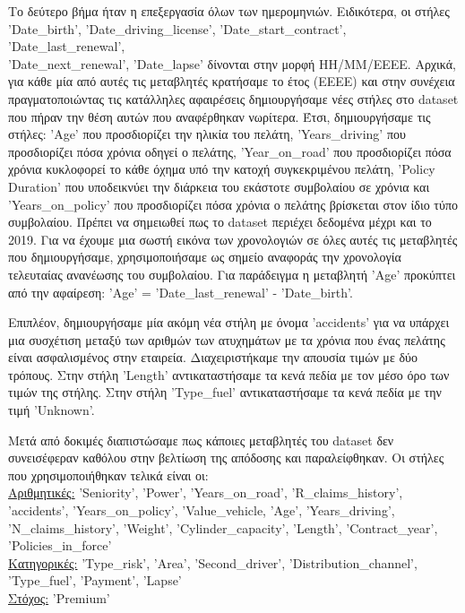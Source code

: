\documentclass{llncs}
\begin{document}
Το δεύτερο βήμα ήταν η επεξεργασία όλων των ημερομηνιών. Ειδικότερα, οι στήλες 'Date\_birth', 'Date\_driving\_license', 'Date\_start\_contract', 'Date\_last\_renewal', \\
'Date\_next\_renewal', 'Date\_lapse' δίνονται στην μορφή ΗΗ/ΜΜ/ΕΕΕΕ. Αρχικά, για κάθε μία από αυτές τις μεταβλητές κρατήσαμε το έτος (ΕΕΕΕ) και στην συνέχεια πραγματοποιώντας τις κατάλληλες αφαιρέσεις
δημιουργήσαμε νέες στήλες στο dataset που πήραν την θέση αυτών που αναφέρθηκαν νωρίτερα. Έτσι, δημιουργήσαμε τις στήλες: 'Age' που προσδιορίζει την ηλικία του πελάτη, 'Years\_driving' που προσδιορίζει 
πόσα χρόνια οδηγεί ο πελάτης, 'Year\_on\_road' που προσδιορίζει πόσα χρόνια κυκλοφορεί το κάθε όχημα υπό την κατοχή συγκεκριμένου πελάτη, 'Policy Duration' που υποδεικνύει την διάρκεια του εκάστοτε συμβολαίου σε χρόνια και 
'Years\_on\_policy' που προσδιορίζει πόσα χρόνια ο πελάτης βρίσκεται στον ίδιο τύπο συμβολαίου. Πρέπει να σημειωθεί πως το dataset περιέχει δεδομένα μέχρι και το 2019. Για να έχουμε μια σωστή εικόνα των χρονολογιών
σε όλες αυτές τις μεταβλητές που δημιουργήσαμε, χρησιμοποιήσαμε ως σημείο αναφοράς την χρονολογία τελευταίας ανανέωσης του συμβολαίου. Για παράδειγμα η μεταβλητή 'Age' προκύπτει από την αφαίρεση:
'Age' = 'Date\_last\_renewal' - 'Date\_birth'.

Επιπλέον, δημιουργήσαμε μία ακόμη νέα στήλη με όνομα 'accidents' για να υπάρχει μια συσχέτιση μεταξύ των αριθμών των ατυχημάτων με τα χρόνια που ένας πελάτης είναι ασφαλισμένος στην εταιρεία.
Διαχειριστήκαμε την απουσία τιμών με δύο τρόπους. Στην στήλη 'Length' αντικαταστήσαμε τα κενά πεδία με τον μέσο όρο των τιμών της στήλης. Στην στήλη 'Type\_fuel' αντικαταστήσαμε τα κενά πεδία με την τιμή 
'Unknown'.

Μετά από δοκιμές διαπιστώσαμε πως κάποιες μεταβλητές του dataset δεν συνεισέφεραν καθόλου στην βελτίωση της απόδοσης και παραλείφθηκαν. 
Οι στήλες που χρησιμοποιήθηκαν τελικά είναι οι:\\
\underline{Αριθμητικές:} 'Seniority', 'Power', 'Years\_on\_road', 'R\_claims\_history', 'accidents', 'Years\_on\_policy', 
 'Value\_vehicle, 'Age', 'Years\_driving', 'N\_claims\_history', 'Weight', 'Cylinder\_capacity', 
 'Length', 'Contract\_year', 'Policies\_in\_force'
\\\underline{Κατηγορικές:} 'Type\_risk', 'Area', 'Second\_driver', 'Distribution\_channel',\\'Type\_fuel', 'Payment', 'Lapse'
\\\underline{Στόχος:} 'Premium'
\end{document}
